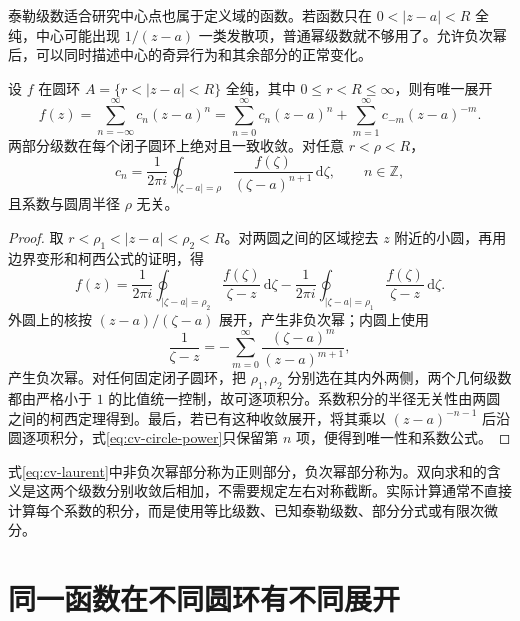 \documentclass[UTF8,12pt,a4paper,fontset=fandol]{ctexbook}
\begin{document}
泰勒级数适合研究中心点也属于定义域的函数。若函数只在 $0<|z-a|<R$ 全纯，中心可能出现 $1/(z-a)$ 一类发散项，普通幂级数就不够用了。允许负次幂后，可以同时描述中心的奇异行为和其余部分的正常变化。

\begin{theorem}[洛朗展开]
\label{thm:cv-laurent}
设 $f$ 在圆环 $A=\{r<|z-a|<R\}$ 全纯，其中 $0\le r<R\le\infty$，则有唯一展开
\begin{equation}
 f(z)=\sum_{n=-\infty}^{\infty}c_n(z-a)^n
 =\sum_{n=0}^{\infty}c_n(z-a)^n+\sum_{m=1}^{\infty}c_{-m}(z-a)^{-m}.
 \label{eq:cv-laurent}
\end{equation}
两部分级数在每个闭子圆环上绝对且一致收敛。对任意 $r<\rho<R$，
\begin{equation}
 c_n=\frac1{2\pi i}\oint_{|\zeta-a|=\rho}
 \frac{f(\zeta)}{(\zeta-a)^{n+1}}\,\mathrm d\zeta,
 \qquad n\in\mathbb Z,
 \label{eq:cv-laurent-coefficient}
\end{equation}
且系数与圆周半径 $\rho$ 无关。
\end{theorem}
\begin{proof}
取 $r<\rho_1<|z-a|<\rho_2<R$。对两圆之间的区域挖去 $z$ 附近的小圆，再用边界变形和柯西公式的证明，得
\[
 f(z)=\frac1{2\pi i}\oint_{|\zeta-a|=\rho_2}\frac{f(\zeta)}{\zeta-z}\,\mathrm d\zeta
 -\frac1{2\pi i}\oint_{|\zeta-a|=\rho_1}\frac{f(\zeta)}{\zeta-z}\,\mathrm d\zeta.
\]
外圆上的核按 $(z-a)/(\zeta-a)$ 展开，产生非负次幂；内圆上使用
\[
 \frac1{\zeta-z}=-\sum_{m=0}^\infty\frac{(\zeta-a)^m}{(z-a)^{m+1}},
\]
产生负次幂。对任何固定闭子圆环，把 $\rho_1,\rho_2$ 分别选在其内外两侧，两个几何级数都由严格小于 $1$ 的比值统一控制，故可逐项积分。系数积分的半径无关性由两圆之间的柯西定理得到。最后，若已有这种收敛展开，将其乘以 $(z-a)^{-n-1}$ 后沿圆逐项积分，式\eqref{eq:cv-circle-power}只保留第 $n$ 项，便得到唯一性和系数公式。
\end{proof}

式\eqref{eq:cv-laurent}中非负次幂部分称为正则部分，负次幂部分称为。双向求和的含义是这两个级数分别收敛后相加，不需要规定左右对称截断。实际计算通常不直接计算每个系数的积分，而是使用等比级数、已知泰勒级数、部分分式或有限次微分。

\section{同一函数在不同圆环有不同展开}
\end{document}
